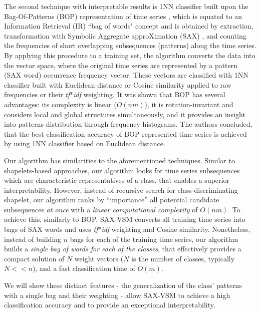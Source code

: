 \documentclass[conference]{IEEEtran}
\begin{document}
The second technique with interpretable results is 1NN classifier built upon the 
Bag-Of-Patterns (BOP) representation of time series \cite{bag_patterns}, 
which is equated to an Information Retrieval (IR) ``bag of words" concept 
and is obtained by extraction, transformation with Symbolic Aggregate 
approXimation (SAX) \cite{sax}, and counting the frequencies
of short overlapping subsequences (patterns) along the time series.
By applying this procedure to a training set, the algorithm converts the data into 
the vector space, where the original time series are represented by a 
pattern (SAX word) occurrence frequency vector. 
These vectors are classified with 1NN classifier built with Euclidean distance 
or Cosine similarity applied to raw frequencies or their \textit{tf$\ast$idf} weighting. 
It was shown that BOP has several advantages: its complexity is linear 
($O(nm)$), it is rotation-invariant and considers local and global structures 
simultaneously, and it provides an insight into patterns distribution through 
frequency histograms.
The authors concluded, that the best classification accuracy of BOP-represented 
time series is achieved by using 1NN classifier based on Euclidean distance.

Our algorithm has similarities to the aforementioned techniques. 
Similar to shapelets-based approaches, our algorithm looks for 
time series subsequences which are characteristic representatives 
of a class, that enables a superior interpretability.
However, instead of recursive search for class-discriminating shapelet, 
our algorithm ranks by “importance” all potential candidate subsequences 
\textit{at once} with a \textit{linear computational complexity} of $O(nm)$.
To achieve this, similarly to BOP, \mbox{SAX-VSM} converts all training 
time series into bags of SAX words and uses \textit{tf$\ast$idf} 
weighting and Cosine similarity.
Nonetheless, instead of building $n$ bags for each of the training time series, 
our algorithm builds a \textit{single bag of words for each of the classes}, 
that effectively provides a compact solution of $N$ weight vectors 
($N$ is the number of classes, typically $N<<n$), and a fast classification time 
of $O(m)$.

We will show these distinct features - the generalization of the class' 
patterns with a single bag and their weighting - allow SAX-VSM to achieve a 
high classification accuracy and to provide an exceptional interpretability.
\end{document}
